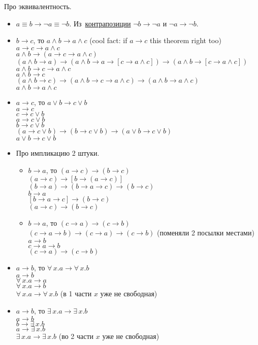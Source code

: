 Про эквивалентность.
\begin{itemize}
	\item $a\equiv b\to \neg a\equiv\neg b$. Из~\hyperlink{conter}{контрапозиции} $\neg b \to \neg a$ и $\neg a \to \neg b$.
	\item $b\to c$, то $a \wedge b\to a\wedge c$ (cool fact: if $a\to c$ this theorem right too)\\
	$a\to c\to a\wedge c$\\
	$a\wedge b\to(a\to c\to a\wedge c)$\\
	$(a\wedge b\to a)\to (a\wedge b\to a\to[c\to a\wedge c])\to (a\wedge b\to [c\to a\wedge c])$\\
	$a\wedge b\to c\to a\wedge c$\\
	$a\wedge b\to c$\\
	$(a\wedge b\to c)\to (a\wedge b\to c\to a\wedge c)\to (a\wedge b \to a\wedge c)$\\
	$a\wedge b\to a\wedge c$
	\item $a\to c$, то $a \vee b\to c\vee b$\\
	$a\to c$\\
	$c\to c\vee b$\\
	$a\to c\vee b$\\
	$b\to c\vee b$\\
	$(a\to c\vee b)\to (b\to c\vee b)\to (a\vee b\to c\vee b)$\\
	$a\vee b\to c\vee b$
	\item Про импликацию 2 штуки. \begin{itemize}
		\item $b\to a$, то $(a\to c)\to(b\to c)$\\
		$(a\to c)\to[b\to (a\to c)]$\\
		$(b\to a)\to (b\to a\to c)\to (b\to c)$\\
		$b\to a$\\
		$[b\to a\to c]\to (b\to c)$\\
		$(a\to c)\to (b \to c)$
		\item $b\to a$, то $(c\to a)\to(c\to b)$\\
		$(c\to a\to b)\to(c\to a)\to(c\to b)$ (поменяли 2 посылки местами)\\
		$a\to b$\\
		$c\to a\to b$\\
		$(c\to a)\to(c\to b)$
	\end{itemize}
	\item $a\to b$, то $\forall\,x.a\to\forall\,x.b$\\
	$a\to b$\\
	$\forall\,x.a\to a$\\
	$\forall\,x.a\to b$\\
	$\forall\,x.a\to\forall\,x.b$ (в 1 части $x$ уже не свободная)
	\item $a\to b$, то $\exists\,x.a\to\exists\,x.b$\\
	$a\to b$\\
	$b\to\exists\,x.b$\\
	$a\to\exists\,x.b$\\
	$\exists\,x.a\to\exists\,x.b$ (во 2 части $x$ уже не свободная)
\end{itemize}

\newpage
